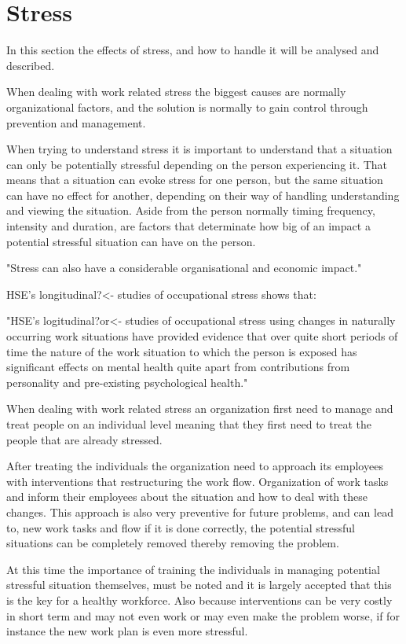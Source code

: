 \section{Stress}
In this section the effects of stress, and how to handle it will be analysed and described.

When dealing with work related stress the biggest causes are normally organizational factors, and the solution is normally to gain control through prevention and management.

When trying to understand stress it is important to understand that a situation can only be potentially stressful depending on the person experiencing it. That means that a situation can evoke stress for one person, but the same situation can have no effect for another, depending on their way of handling understanding and viewing the situation. Aside from the person normally timing frequency, intensity and duration, are factors that determinate how big of an impact a potential stressful situation can have on the person.

"Stress can also have a considerable organisational and economic impact."

HSE's longitudinal?<- studies of occupational stress shows that:

"HSE's logitudinal?or<- studies of occupational stress using changes in naturally occurring work situations have provided evidence that over quite short periods of time the nature of the work situation to which the person is exposed has significant effects on mental health quite apart from contributions from personality and pre-existing psychological health."

When dealing with work related stress an organization first need to manage and treat people on an individual level meaning that they first need to treat the people that are already stressed\cite{control_stress_work}.

After treating the individuals the organization need to approach its employees with interventions that restructuring the work flow. Organization of work tasks and inform their employees about the situation and how to deal with these changes. This approach is also very preventive for future problems, and can lead to, new work tasks and flow if it is done correctly, the potential stressful situations can be completely removed thereby removing the problem.

At this time the importance of training the individuals in managing potential stressful situation themselves, must be noted and it is largely accepted that this is the key for a healthy workforce. Also because interventions can be very costly in short term and may not even work or may even make the problem worse, if for instance the new work plan is even more stressful.

